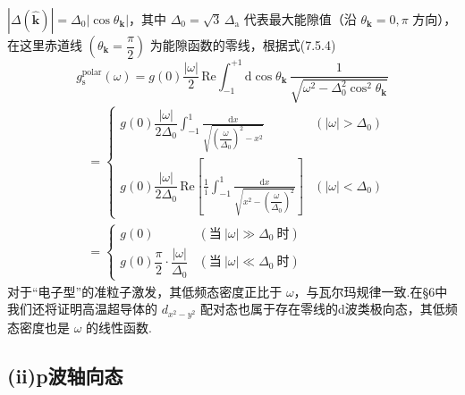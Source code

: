 $\left|\Delta(\hat{\boldsymbol{k}})\right|=\Delta_{0}\left|\cos\theta_{\boldsymbol{k}}\right|$，其中 $\Delta_{0}=\sqrt{3}\,\Delta_{\mathrm{a}}$ 代表最大能隙值（沿 $\theta_{\boldsymbol{k}}=0,\pi$ 方向），在这里赤道线 $\left(\theta_{\boldsymbol{k}}=\dfrac{\pi}{2}\right)$ 为能隙函数的零线，根据式(7.5.4)
\begin{equation*}
  g_{\mathrm{s}}^{\mathrm{polar}}(\omega)=g(0)\frac{\left|\omega\right|}{2}\,\mathrm{Re}
  \int_{-1}^{+1}\mathrm{d}\cos\theta_{\boldsymbol{k}}\,
  \frac{1}{\sqrt{\omega^{2}-\Delta_{0}^{2}\cos^{2}\theta_{\boldsymbol{k}}}}
\end{equation*}
\begin{equation}
\begin{aligned}
  &=\begin{cases}
    g(0)\dfrac{\left|\omega\right|}{2\Delta_{0}}\displaystyle\int_{-1}^{1}\frac{\mathrm{d}x}
    {\sqrt{\left(\dfrac{\omega}{\Delta_{0}}\right)^{2}-x^{2}}} & \left(\left|\omega\right|>\Delta_{0}\right)\\[2em]
    g(0)\dfrac{\left|\omega\right|}{2\Delta_{0}}\,\mathrm{Re}\left[\frac{1}{\mathrm{i}}\int_{-1}^{1}\frac{\mathrm{d}x}
    {\sqrt{x^{2}-\left(\dfrac{\omega}{\Delta_{0}}\right)^{2}}}\right] & \left(\left|\omega\right|<\Delta_{0}\right)
  \end{cases}\\
  &=\begin{cases}
    g(0) & \left(\text{当}\ \left|\omega\right|\gg\Delta_{0}\ \text{时}\right)\\[0.5em]
    g(0)\dfrac{\pi}{2}\cdot\dfrac{\left|\omega\right|}{\Delta_{0}} & \left(\text{当}\ \left|\omega\right|\ll\Delta_{0}\ \text{时}\right)
  \end{cases}
\end{aligned}
\end{equation}
对于“电子型”的准粒子激发，其低频态密度正比于 $\omega$，与瓦尔玛规律一致.在§6中我们还将证明高温超导体的 $d_{x^{2}-y^{2}}$ 配对态也属于存在零线的d波类极向态，其低频态密度也是 $\omega$ 的线性函数.

\subsection*{(ii)p波轴向态}


